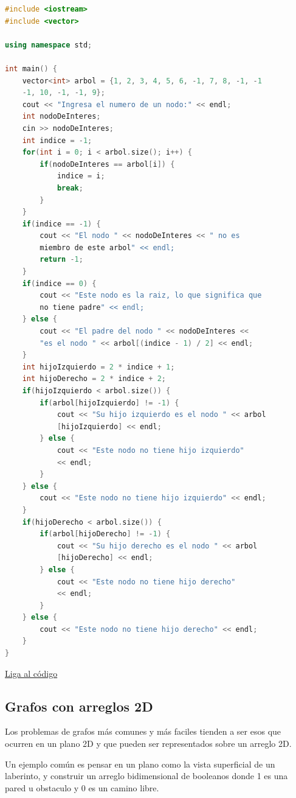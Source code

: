 \documentclass{article}
\begin{document}
\begin{lstlisting}[language=C++, caption=Arbol de binario]
#include <iostream>
#include <vector>

using namespace std;

int main() {
    vector<int> arbol = {1, 2, 3, 4, 5, 6, -1, 7, 8, -1, -1
    -1, 10, -1, -1, 9};
    cout << "Ingresa el numero de un nodo:" << endl;
    int nodoDeInteres;
    cin >> nodoDeInteres;
    int indice = -1;
    for(int i = 0; i < arbol.size(); i++) {
        if(nodoDeInteres == arbol[i]) {
            indice = i;
            break;
        }
    }
    if(indice == -1) {
        cout << "El nodo " << nodoDeInteres << " no es
        miembro de este arbol" << endl;
        return -1;
    }
    if(indice == 0) {
        cout << "Este nodo es la raiz, lo que significa que
        no tiene padre" << endl;
    } else {
        cout << "El padre del nodo " << nodoDeInteres <<
        "es el nodo " << arbol[(indice - 1) / 2] << endl;
    }
    int hijoIzquierdo = 2 * indice + 1;
    int hijoDerecho = 2 * indice + 2;
    if(hijoIzquierdo < arbol.size()) {
        if(arbol[hijoIzquierdo] != -1) {
            cout << "Su hijo izquierdo es el nodo " << arbol
            [hijoIzquierdo] << endl;
        } else {
            cout << "Este nodo no tiene hijo izquierdo"
            << endl;
        }
    } else {
        cout << "Este nodo no tiene hijo izquierdo" << endl;
    }
    if(hijoDerecho < arbol.size()) {
        if(arbol[hijoDerecho] != -1) {
            cout << "Su hijo derecho es el nodo " << arbol
            [hijoDerecho] << endl;
        } else {
            cout << "Este nodo no tiene hijo derecho"
            << endl;
        }
    } else {
        cout << "Este nodo no tiene hijo derecho" << endl;
    }
}
\end{lstlisting}
\href{https://repl.it/@Jamesscn/Arboles-Binarios}{Liga al código}

\subsection{Grafos con arreglos 2D}

Los problemas de grafos más comunes y más faciles tienden a ser esos que ocurren en un plano 2D y que pueden ser representados sobre un arreglo 2D.

Un ejemplo común es pensar en un plano como la vista superficial de un laberinto, y construir un arreglo bidimensional de booleanos donde 1 es una pared u obstaculo y 0 es un camino libre.
\end{document}
